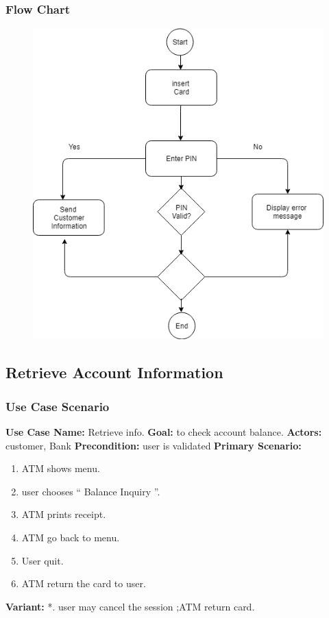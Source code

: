 \documentclass{article}
\begin{document}
		\newpage\subsubsection{Flow Chart}
		\begin{figure}[h!]
			\begin{center}
				\includegraphics[height=\linewidth]{img/validate_flowchart.png}
			\end{center}
		\end{figure}
	
	
	\newpage\subsection{Retrieve Account Information}
	\subsubsection{Use Case Scenario}
		\textbf{Use Case Name:}	Retrieve info.
		\newline\textbf{Goal:} to check account balance.
		\newline\textbf{Actors:} customer, Bank 	
		\newline\textbf{Precondition:} user is validated 	
		\newline\textbf{Primary Scenario:}	
			\begin{enumerate}[label*=\arabic*.]
				\item ATM shows menu.
				\item user chooses “ Balance Inquiry ”.
				\item ATM prints receipt.
				\item ATM go back to menu.
				\item User quit.
				\item ATM return the card to user.
			\end{enumerate}
		\textbf{Variant:}\newline	
			\hspace*{5mm}*. user may cancel the session ;ATM return card.
\end{document}

